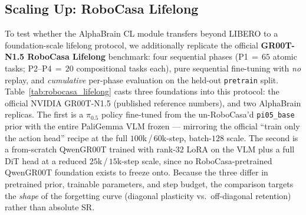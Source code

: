 \subsection{Scaling Up: RoboCasa Lifelong}
\label{sec:cl_robocasa}

To test whether the AlphaBrain CL module transfers beyond LIBERO to a foundation-scale lifelong protocol, we additionally replicate the official \textbf{GR00T-N1.5 RoboCasa Lifelong} benchmark: four sequential phases (P1\,$=$\,$65$ atomic tasks; P2--P4\,$=$\,$20$ compositional tasks each), pure sequential fine-tuning with \emph{no} replay, and \emph{cumulative} per-phase evaluation on the held-out \texttt{pretrain} split. Table~\ref{tab:robocasa_lifelong} casts three foundations into this protocol: the official NVIDIA GR00T-N1.5 (published reference numbers), and two AlphaBrain replicas. The first is a $\pi_{0.5}$ policy fine-tuned from the un-RoboCasa'd \texttt{pi05\_base} prior with the entire PaliGemma VLM frozen --- mirroring the official ``train only the action head'' recipe at the full $100$k\,/\,$60$k-step, batch-$128$ scale. The second is a from-scratch QwenGR00T trained with rank-$32$ LoRA on the VLM plus a full DiT head at a reduced $25$k\,/\,$15$k-step scale, since no RoboCasa-pretrained QwenGR00T foundation exists to freeze onto. Because the three differ in pretrained prior, trainable parameters, and step budget, the comparison targets the \emph{shape} of the forgetting curve (diagonal plasticity vs.\ off-diagonal retention) rather than absolute SR.

